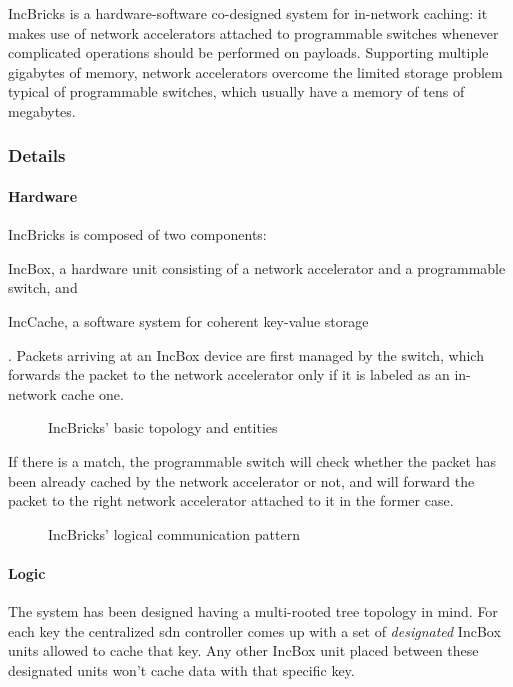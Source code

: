 IncBricks \cite{incbricks} is a hardware-software co-designed system for in-network caching: it makes use of network accelerators attached to programmable switches whenever complicated operations should be performed on payloads.
Supporting multiple gigabytes of memory, network accelerators overcome the limited storage problem typical of programmable switches, which usually have a memory of tens of megabytes.

\subsubsection{Details} \label{incbricks_details}
\paragraph{Hardware}
IncBricks \cite{incbricks} is composed of two components:
\begin{mylist}
    \item IncBox, a hardware unit consisting of a network accelerator and a programmable switch, and
    \item IncCache, a software system for coherent key-value storage
\end{mylist}.
Packets arriving at an IncBox device are first managed by the switch, which forwards the packet to the network accelerator only if it is labeled as an in-network cache one.

\begin{figure}[!htb]
    \centering
    \usebox{\incbricksbasic}
    \caption{IncBricks' \texorpdfstring{\cite{incbricks}}{} basic topology and entities}
\end{figure}

If there is a match, the programmable switch will check whether the packet has been already cached by the network accelerator or not, and will forward the packet to the right network accelerator attached to it in the former case.

\begin{figure}[!htb]
    \centering
    \usebox{\incbrickscommunication}
    \caption{IncBricks' \texorpdfstring{\cite{incbricks}}{} logical communication pattern}
\end{figure}

\paragraph{Logic}
The system has been designed having a multi-rooted tree topology in mind.
For each key the centralized \gls{sdn} controller comes up with a set of \textit{designated} IncBox units allowed to cache that key.
Any other IncBox unit placed between these designated units won't cache data with that specific key.

